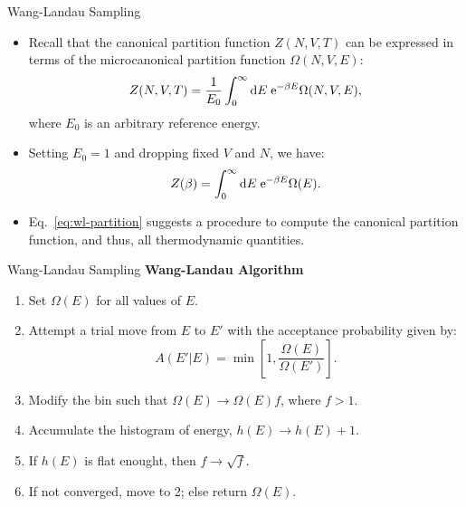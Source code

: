 \documentclass[10pt]{beamer}
\newcommand{\emphbox}[1]{%
\noindent\colorbox{shade}{%
\begin{minipage}{\dimexpr\linewidth-2\fboxsep}#1\end{minipage}}}
\begin{document}
\begin{frame}{Wang-Landau Sampling}
\begin{itemize}
\setlength\itemsep{1em}
  \item Recall that the canonical partition function $Z(N,V,T)$ can be expressed in terms of the microcanonical partition function $\Omega(N,V,E)$:
  \begin{equation}
    Z(N,V,T) = \frac{1}{E_0} \int_0^\infty \mathrm{d} E\; \mathrm{e}^{-\beta E} \Omega(N,V,E),
  \end{equation}
  where $E_0$ is an arbitrary reference energy.

  \item Setting $E_0=1$ and dropping fixed $V$ and $N$, we have:
  \begin{equation}
  \label{eq:wl-partition}
    Z(\beta) = \int_0^\infty \mathrm{d} E\; \mathrm{e}^{-\beta E}\Omega(E).
  \end{equation}

  \item Eq.~\ref{eq:wl-partition} suggests a procedure to compute the canonical partition function, and thus, all thermodynamic quantities.

  \end{itemize}
\end{frame}

\begin{frame}{Wang-Landau Sampling}
\textbf{Wang-Landau Algorithm}
\vspace{0.2cm}
\emphbox{
  \begin{enumerate}
  \setlength\itemsep{1em}
    \item Set $\Omega(E)$ for all values of $E$.

    \item Attempt a trial move from $E$ to $E'$ with the acceptance probability given by:
    \begin{equation}
      A(E'|E) = \min\left[ 1, \frac{\Omega(E)}{\Omega(E')} \right].
    \end{equation}

    \item Modify the bin such that $\Omega(E) \rightarrow \Omega(E)f$, where $f>1$.

    \item Accumulate the histogram of energy, $h(E) \rightarrow h(E)+1$.

    \item If $h(E)$ is flat enought, then $f \rightarrow \sqrt{f}$.

    \item If not converged, move to 2; else return $\Omega(E)$.
  \end{enumerate}
}
\end{frame}
\end{document}
